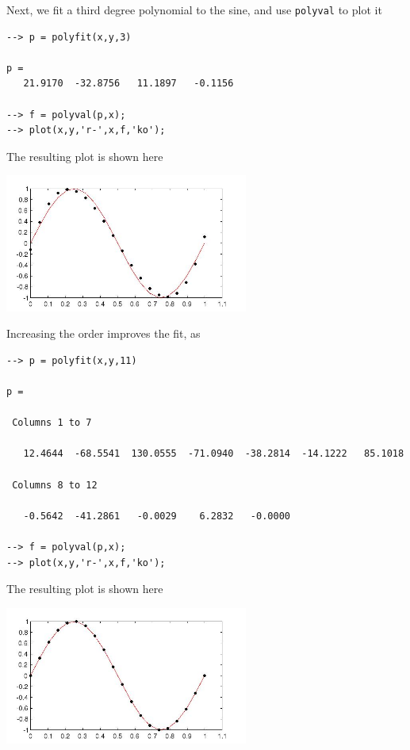 Next, we fit a third degree polynomial to the sine, and use
\verb|polyval| to plot it
\begin{verbatim}
--> p = polyfit(x,y,3)

p = 
   21.9170  -32.8756   11.1897   -0.1156 

--> f = polyval(p,x);
--> plot(x,y,'r-',x,f,'ko');
\end{verbatim}
The resulting plot is shown here


\centerline{\includegraphics[width=8cm]{polyfit2}}

Increasing the order improves the fit, as
\begin{verbatim}
--> p = polyfit(x,y,11)

p = 

 Columns 1 to 7

   12.4644  -68.5541  130.0555  -71.0940  -38.2814  -14.1222   85.1018 

 Columns 8 to 12

   -0.5642  -41.2861   -0.0029    6.2832   -0.0000 

--> f = polyval(p,x);
--> plot(x,y,'r-',x,f,'ko');
\end{verbatim}
The resulting plot is shown here


\centerline{\includegraphics[width=8cm]{polyfit3}}

